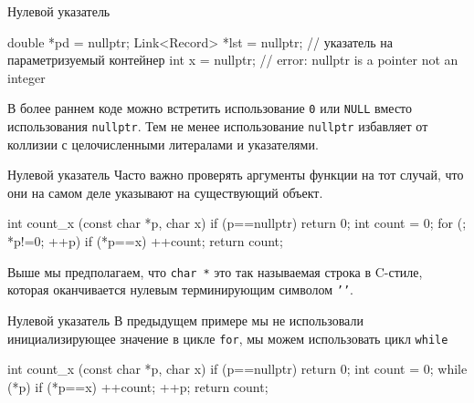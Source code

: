 \documentclass[
    9pt,
    hyperref={pdfencoding=unicode}
    ]{beamer}
\theoremstyle{definition}
\begin{document}
\begin{frame}[fragile]{Нулевой указатель}
    \begin{cppcode}
        double *pd = nullptr;
        Link<Record> *lst = nullptr; // указатель на параметризуемый контейнер
        int x = nullptr;     		 // error: nullptr is a pointer not an integer
    \end{cppcode}

    \vspace{2em}
    
    В более раннем коде можно встретить использование \texttt{0} или \texttt{NULL} вместо использования \texttt{nullptr}. Тем не менее использование \texttt{nullptr} избавляет от коллизии с целочисленными литералами и указателями.  

\end{frame}

\begin{frame}[fragile]{Нулевой указатель}
    Часто важно проверять аргументы функции на тот случай, что они на самом деле указывают на существующий объект.
    \begin{cppcode}
        int count_x (const char *p, char x)
        {
            if (p==nullptr)
                return 0;
            int count = 0;
            for (; *p!=0; ++p)
                if (*p==x)
                    ++count;
            return count;
        }
    \end{cppcode}
    Выше мы предполагаем, что \texttt{char *} это так называемая строка в C-стиле, которая оканчивается нулевым терминирующим символом \texttt{'\0'}.
\end{frame}

\begin{frame}[fragile]{Нулевой указатель}
    В предыдущем примере мы не использовали инициализирующее значение в цикле \texttt{for}, мы можем использовать цикл \texttt{while}
    \begin{cppcode}
        int count_x (const char *p, char x)
        {
            if (p==nullptr)
            return 0;
            int count = 0;
            while (*p)
            {
                if (*p==x)
                    ++count;
                ++p;
            }
            return count;
        }
    \end{cppcode}
\end{frame}
\end{document}
